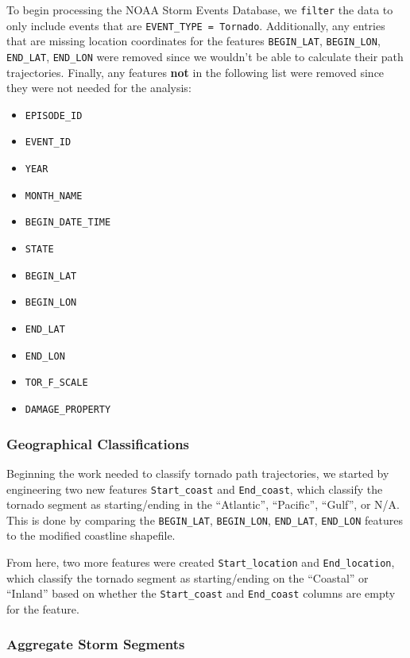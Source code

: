 \documentclass[
  letterpaper,
  DIV=11,
  numbers=noendperiod]{scrreprt}
\begin{document}
To begin processing the NOAA Storm Events Database, we \texttt{filter}
the data to only include events that are
\texttt{EVENT\_TYPE\ =\ Tornado}. Additionally, any entries that are
missing location coordinates for the features \texttt{BEGIN\_LAT},
\texttt{BEGIN\_LON}, \texttt{END\_LAT}, \texttt{END\_LON} were removed
since we wouldn't be able to calculate their path trajectories. Finally,
any features \textbf{not} in the following list were removed since they
were not needed for the analysis:

\begin{itemize}
\item
  \texttt{EPISODE\_ID}
\item
  \texttt{EVENT\_ID}
\item
  \texttt{YEAR}
\item
  \texttt{MONTH\_NAME}
\item
  \texttt{BEGIN\_DATE\_TIME}
\item
  \texttt{STATE}
\item
  \texttt{BEGIN\_LAT}
\item
  \texttt{BEGIN\_LON}
\item
  \texttt{END\_LAT}
\item
  \texttt{END\_LON}
\item
  \texttt{TOR\_F\_SCALE}
\item
  \texttt{DAMAGE\_PROPERTY}
\end{itemize}

\subsubsection{Geographical
Classifications}\label{geographical-classifications-1}

Beginning the work needed to classify tornado path trajectories, we
started by engineering two new features \texttt{Start\_coast} and
\texttt{End\_coast}, which classify the tornado segment as
starting/ending in the ``Atlantic'', ``Pacific'', ``Gulf'', or N/A. This
is done by comparing the \texttt{BEGIN\_LAT}, \texttt{BEGIN\_LON},
\texttt{END\_LAT}, \texttt{END\_LON} features to the modified coastline
shapefile.

From here, two more features were created \texttt{Start\_location} and
\texttt{End\_location}, which classify the tornado segment as
starting/ending on the ``Coastal'' or ``Inland'' based on whether the
\texttt{Start\_coast} and \texttt{End\_coast} columns are empty for the
feature.

\subsubsection{Aggregate Storm Segments}\label{sec-aggregate-segments}
\end{document}
